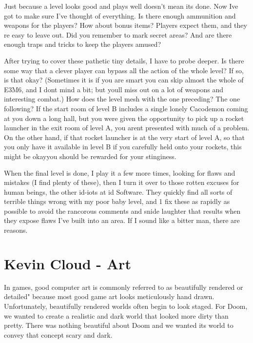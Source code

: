     Just because a level looks good and plays well doesn't mean its done. Now Ive got to make sure I've thought of everything. Is there enough ammunition and weapons for the players? How about bonus items? Players expect them, and they re easy to leave out. Did you remember to mark secret areas? And are there enough traps and tricks to keep the players amused?\\
    \par
     After trying to cover these pathetic tiny details, I have to probe deeper. Is there some way that a clever player can bypass all the action of the whole level? If so, is that okay? (Sometimes it is if you are smart you can skip almost the whole of E3M6, and I dont mind a bit; but youll miss out on a lot of weapons and interesting combat.) How does the level mesh with the one preceding? The one following? If the start room of level B includes a single lonely Cacodemon coming at you down a long hall, but you were given the opportunity to pick up a rocket launcher in the exit room of level A, you arent presented with much of a problem. On the other hand, if that rocket launcher is at the very start of level A, so that you only have it available in level B if you carefully held onto your rockets, this might be okayyou should be rewarded for your stinginess.\\
     \par
      When the final level is done, I play it a few more times, looking for flaws and mistakes (I find plenty of these), then I turn it over to those rotten excuses for human beings,  the other id-iots at id Software. They quickly find all sorts of terrible things wrong with my poor baby level, and 1 fix these as rapidly as possible to avoid the rancorous comments and snide laughter that results when they expose flaws I've built into an area. If I sound like a bitter man, there are reasons.



\section{Kevin Cloud - Art}

In games, good computer art is commonly referred to as beautifully rendered or detailed" because most good game art looks meticulously hand drawn. Unfortunately, beautifully rendered worlds often begin to look staged. For Doom, we wanted to create a realistic and dark world that looked more dirty than pretty. There was nothing beautiful about Doom and we wanted its world to convey that concept scary and dark.\\
\par

